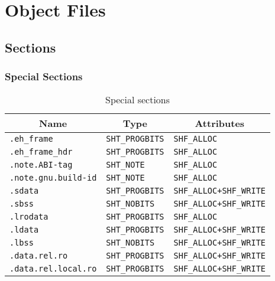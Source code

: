 
\chapter{Object Files}

\section{Sections}

\subsection{Special Sections}

\begin{table}[H]
\Hrule
  \caption{Special sections}
  \begin{center}
    \begin{tabular}[t]{l|l|l}
      \multicolumn{1}{c}{Name} & \multicolumn{1}{c}{Type}
       & \multicolumn{1}{c}{Attributes} \\
      \hline
      \texttt{.eh_frame} & \texttt{SHT_PROGBITS} & \texttt{SHF_ALLOC} \\
      \texttt{.eh_frame_hdr} & \texttt{SHT_PROGBITS} & \texttt{SHF_ALLOC} \\
      \texttt{.note.ABI-tag} & \texttt{SHT_NOTE} & \texttt{SHF_ALLOC} \\
      \texttt{.note.gnu.build-id} & \texttt{SHT_NOTE} & \texttt{SHF_ALLOC} \\
      \texttt{.sdata} & \texttt{SHT_PROGBITS} & \texttt{SHF_ALLOC+SHF_WRITE} \\
      \texttt{.sbss} & \texttt{SHT_NOBITS} & \texttt{SHF_ALLOC+SHF_WRITE} \\
      \texttt{.lrodata} & \texttt{SHT_PROGBITS} & \texttt{SHF_ALLOC} \\
      \texttt{.ldata} & \texttt{SHT_PROGBITS} & \texttt{SHF_ALLOC+SHF_WRITE} \\
      \texttt{.lbss} & \texttt{SHT_NOBITS} & \texttt{SHF_ALLOC+SHF_WRITE} \\
      \texttt{.data.rel.ro} & \texttt{SHT_PROGBITS} & \texttt{SHF_ALLOC+SHF_WRITE} \\
      \texttt{.data.rel.local.ro} & \texttt{SHT_PROGBITS} & \texttt{SHF_ALLOC+SHF_WRITE}
    \end{tabular}
  \end{center}
\Hrule
\end{table}

